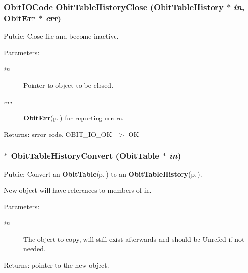 \subsubsection{\setlength{\rightskip}{0pt plus 5cm}Obit\-IOCode Obit\-Table\-History\-Close ({\bf Obit\-Table\-History} $\ast$ {\em in}, {\bf Obit\-Err} $\ast$ {\em err})}\label{ObitTableHistory_8h_a21}


Public: Close file and become inactive. 

\begin{Desc}
\item[Parameters:]
\begin{description}
\item[{\em in}]Pointer to object to be closed. \item[{\em err}]{\bf Obit\-Err}{\rm (p.\,\pageref{structObitErr})} for reporting errors. \end{description}
\end{Desc}
\begin{Desc}
\item[Returns:]error code, OBIT\_\-IO\_\-OK=$>$ OK \end{Desc}
\subsubsection{$\ast$ Obit\-Table\-History\-Convert ({\bf Obit\-Table} $\ast$ {\em in})}\label{ObitTableHistory_8h_a16}


Public: Convert an {\bf Obit\-Table}{\rm (p.\,\pageref{structObitTable})} to an {\bf Obit\-Table\-History}{\rm (p.\,\pageref{structObitTableHistory})}. 

New object will have references to members of in. \begin{Desc}
\item[Parameters:]
\begin{description}
\item[{\em in}]The object to copy, will still exist afterwards and should be Unrefed if not needed. \end{description}
\end{Desc}
\begin{Desc}
\item[Returns:]pointer to the new object. \end{Desc}
